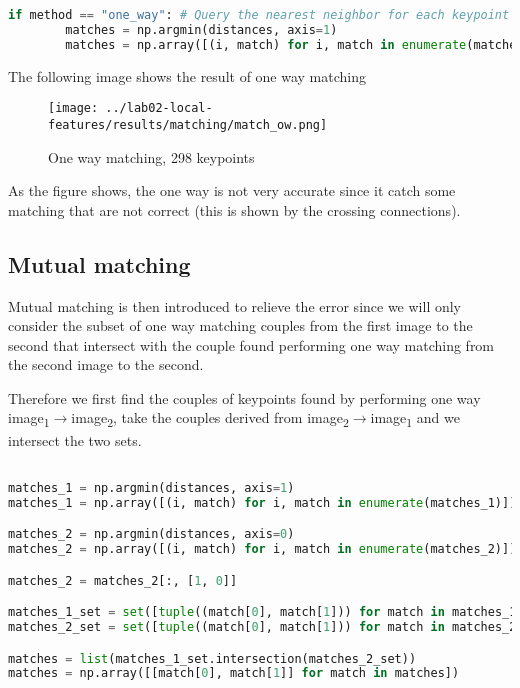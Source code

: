 \documentclass{ETHExercise}
\begin{document}
\begin{lstlisting}[language=Python, caption=One way matching]
  if method == "one_way": # Query the nearest neighbor for each keypoint in image 1
        matches = np.argmin(distances, axis=1)
        matches = np.array([(i, match) for i, match in enumerate(matches)])
\end{lstlisting}

The following image shows the result of one way matching

\begin{figure}[h]
  \centering
  \texttt{[image: ../lab02-local-features/results/matching/match\_ow.png]}
  \caption{One way matching, 298 keypoints}
\end{figure}

As the figure shows, the one way is not very accurate since it 
catch some matching that are not correct (this is shown by the crossing connections).

\subsection{Mutual matching}

Mutual matching is then introduced to relieve the error since 
we will only consider the subset of one way matching couples from the first
image to the second that intersect with the couple found performing one
way matching from the second image to the second.

Therefore we first find the couples of keypoints found by performing 
one way image\textsubscript{1}$\rightarrow$image\textsubscript{2}, take
the couples derived from  image\textsubscript{2}$\rightarrow$image\textsubscript{1}
and we intersect the two sets.

\begin{lstlisting}[language=Python, caption=Mutual matching]

matches_1 = np.argmin(distances, axis=1)
matches_1 = np.array([(i, match) for i, match in enumerate(matches_1)])

matches_2 = np.argmin(distances, axis=0)
matches_2 = np.array([(i, match) for i, match in enumerate(matches_2)])

matches_2 = matches_2[:, [1, 0]]

matches_1_set = set([tuple((match[0], match[1])) for match in matches_1])
matches_2_set = set([tuple((match[0], match[1])) for match in matches_2])

matches = list(matches_1_set.intersection(matches_2_set))
matches = np.array([[match[0], match[1]] for match in matches])
\end{lstlisting}
\end{document}
